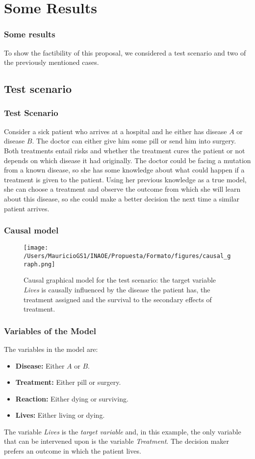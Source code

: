 \documentclass{beamer}
\theoremstyle{plain}
\begin{document}
\section{Some Results}
\begin{frame}
\frametitle{Some results}
To show the factibility of this proposal, we considered a test scenario and two of the previously mentioned cases.
\end{frame}
\subsection{Test scenario}
\begin{frame}
\frametitle{Test Scenario}
Consider a sick patient who arrives at a hospital and he either has disease $A$ or disease $B$. The doctor can either give him some pill or send him into surgery.  Both treatments entail risks and whether the treatment cures the patient or not depends on which disease it had originally. The doctor could be facing a mutation from a known disease, so she has some knowledge about what could happen if a treatment is given to the patient. Using her previous knowledge as a true model, she can choose a treatment and observe the outcome from which she will learn about this disease, so she could make a better decision the next time a similar patient arrives.
\end{frame}

\begin{frame}
\frametitle{Causal model}
\begin{figure}[ht]
\vskip 0.2in
\begin{center}
\centerline{\texttt{[image: /Users/MauricioGS1/INAOE/Propuesta/Formato/figures/causal\_graph.png]}}
\caption{Causal graphical model for the test scenario: the target variable \textit{Lives} is causally influenced by the disease the patient has, the treatment assigned and the survival to the secondary effects of treatment.}
\label{causal_model}
\end{center}
\vskip -0.2in
\end{figure}
\end{frame}

\begin{frame}
\frametitle{Variables of the Model}
The variables in the model are: 
\begin{itemize}
\item \textbf{Disease:} Either $A$ or $B$.
\item \textbf{Treatment:} Either pill or surgery.
\item \textbf{Reaction:} Either dying or surviving.
\item \textbf{Lives:} Either living or dying.
\end{itemize}
The variable \textit{Lives} is the \textit{target variable} and, in this example, the only variable that can be intervened upon is the variable \textit{Treatment}. The decision maker prefers an outcome in which the patient lives.
\end{frame}
\end{document}
